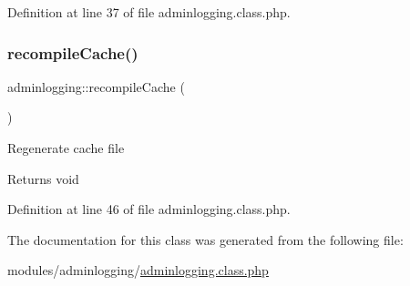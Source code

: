 Definition at line 37 of file adminlogging.\+class.\+php.

\mbox{\label{classadminlogging_ad272a76b7aa666b084b7c0f6ab91b61c}} 
\subsubsection{\texorpdfstring{recompile\+Cache()}{recompileCache()}}
{\footnotesize\ttfamily adminlogging\+::recompile\+Cache (\begin{DoxyParamCaption}{ }\end{DoxyParamCaption})}

Regenerate cache file \begin{DoxyReturn}{Returns}
void 
\end{DoxyReturn}


Definition at line 46 of file adminlogging.\+class.\+php.



The documentation for this class was generated from the following file\+:\begin{DoxyCompactItemize}
\item 
modules/adminlogging/\hyperlink{adminlogging_8class_8php}{adminlogging.\+class.\+php}\end{DoxyCompactItemize}

